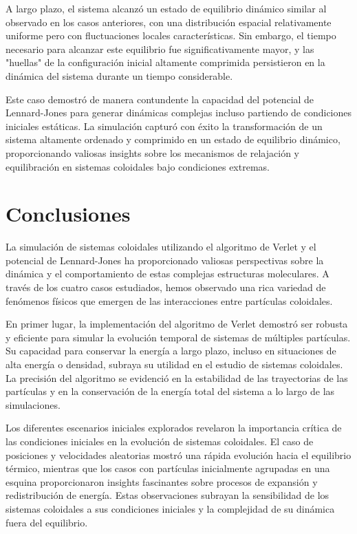 \documentclass[twocolumn]{article}
\begin{document}
A largo plazo, el sistema alcanzó un estado de equilibrio dinámico similar al observado en los casos anteriores, con una distribución espacial relativamente uniforme pero con fluctuaciones locales características. Sin embargo, el tiempo necesario para alcanzar este equilibrio fue significativamente mayor, y las "huellas" de la configuración inicial altamente comprimida persistieron en la dinámica del sistema durante un tiempo considerable.

Este caso demostró de manera contundente la capacidad del potencial de Lennard-Jones para generar dinámicas complejas incluso partiendo de condiciones iniciales estáticas. La simulación capturó con éxito la transformación de un sistema altamente ordenado y comprimido en un estado de equilibrio dinámico, proporcionando valiosas insights sobre los mecanismos de relajación y equilibración en sistemas coloidales bajo condiciones extremas.

\section{Conclusiones}

La simulación de sistemas coloidales utilizando el algoritmo de Verlet y el potencial de Lennard-Jones ha proporcionado valiosas perspectivas sobre la dinámica y el comportamiento de estas complejas estructuras moleculares. A través de los cuatro casos estudiados, hemos observado una rica variedad de fenómenos físicos que emergen de las interacciones entre partículas coloidales.

En primer lugar, la implementación del algoritmo de Verlet demostró ser robusta y eficiente para simular la evolución temporal de sistemas de múltiples partículas. Su capacidad para conservar la energía a largo plazo, incluso en situaciones de alta energía o densidad, subraya su utilidad en el estudio de sistemas coloidales. La precisión del algoritmo se evidenció en la estabilidad de las trayectorias de las partículas y en la conservación de la energía total del sistema a lo largo de las simulaciones.

Los diferentes escenarios iniciales explorados revelaron la importancia crítica de las condiciones iniciales en la evolución de sistemas coloidales. El caso de posiciones y velocidades aleatorias mostró una rápida evolución hacia el equilibrio térmico, mientras que los casos con partículas inicialmente agrupadas en una esquina proporcionaron insights fascinantes sobre procesos de expansión y redistribución de energía. Estas observaciones subrayan la sensibilidad de los sistemas coloidales a sus condiciones iniciales y la complejidad de su dinámica fuera del equilibrio.
\end{document}
